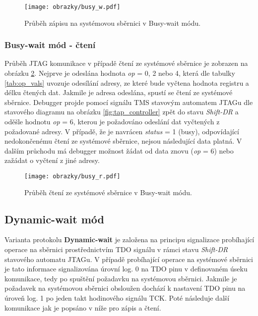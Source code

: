 \begin{figure}[!h]
  \begin{center}
    \texttt{[image: obrazky/busy\_w.pdf]}
  \end{center}
  \caption{Průběh zápisu na systémovou sběrnici v Busy-wait módu.}
	\label{fig:busy_w}
\end{figure}

\subsubsection{Busy-wait mód - čtení} 
Průběh JTAG komunikace v případě čtení ze systémové sběrnice je zobrazen na obrázku \ref{fig:busy_r}. Nejprve je odeslána hodnota \textit{op} = 0, 2 nebo 4, která dle tabulky \ref{tab:op_vals} uvozuje odesílání adresy, ze které bude vyčtena hodnota registru a délku čtených dat. Jakmile je adresa odeslána, spustí se čtení ze systémové sběrnice. Debugger projde pomocí signálu \acs{TMS} stavovým automatem JTAGu dle stavového diagramu na obrázku \ref{fig:tap_controller} zpět do stavu \textit{Shift-DR} a oděšle hodnotu \textit{op} = 6, kterou je požadováno odeslání dat vyčtených z požadované adresy. V případě, že je navrácen \textit{status} = 1 (busy), odpovídající nedokončenému čtení ze systémové sběrnice, nejsou následující data platná. V dalším průchodu má debugger možnost žádat od data znovu (\textit{op} = 6) nebo zažádat o vyčtení z jiné adresy.

\begin{figure}[!h]
  \begin{center}
    \texttt{[image: obrazky/busy\_r.pdf]}
  \end{center}
  \caption{Průběh čtení ze systémové sběrnice v Busy-wait módu.}
	\label{fig:busy_r}
\end{figure}

\subsection{Dynamic-wait mód}	\label{subsec:dyn-wait}
Varianta protokolu \textbf{Dynamic-wait} je založena na principu signalizace probíhající operace na sběrnici prostřednictvím \acs{TDO} signálu v rámci stavu \textit{Shift-DR} stavového automatu JTAGu. V případě probíhající operace na systémové sběrnici je tato informace signalizována úrovní log. 0 na \acs{TDO} pinu v definovaném úseku komunikace, tedy po spuštění požadavku na systémovou sběrnici. Jakmile je požadavek na systémovou sběrnici obsloužen dochází k nastavení \acs{TDO} pinu na úroveň log. 1 po jeden takt hodinového signálu \acs{TCK}. Poté následuje další komunikace jak je popsáno v níže pro zápis a čtení.

